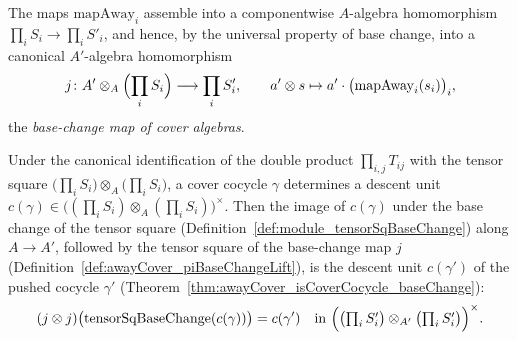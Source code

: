 \begin{definition}
  \label{def:awayCover_piBaseChangeLift}
  \leanok
  The maps \(\mathrm{mapAway}_i\) assemble into a componentwise \(A\)-algebra homomorphism
  \(\prod_i S_i \to \prod_i S'_i\), and hence, by the universal property of base change, into a
  canonical \(A'\)-algebra homomorphism
  \[
    j \colon A' \otimes_A \Bigl(\prod_i S_i\Bigr) \longrightarrow \prod_i S'_i, \qquad
    a' \otimes s \mapsto a' \cdot \bigl(\mathrm{mapAway}_i(s_i)\bigr)_i,
  \]
  the \emph{base-change map of cover algebras}.
\end{definition}

\begin{theorem}
  \label{thm:awayCover_cocycleUnit_baseChange}
  \leanok
  Under the canonical identification of the double product \(\prod_{i,j} T_{ij}\) with the
  tensor square \(\bigl(\prod_i S_i\bigr) \otimes_A \bigl(\prod_i S_i\bigr)\), a cover cocycle
  \(\gamma\) determines a descent unit \(c(\gamma) \in \bigl((\prod_i S_i) \otimes_A (\prod_i
  S_i)\bigr)^{\times}\).  Then the image of \(c(\gamma)\) under the base change of the tensor
  square (Definition~\ref{def:module_tensorSqBaseChange}) along \(A \to A'\), followed by the
  tensor square of the base-change map \(j\)
  (Definition~\ref{def:awayCover_piBaseChangeLift}), is the descent unit \(c(\gamma')\) of the
  pushed cocycle \(\gamma'\) (Theorem~\ref{thm:awayCover_isCoverCocycle_baseChange}):
  \[
    (j \otimes j)\bigl(\mathrm{tensorSqBaseChange}(c(\gamma))\bigr) = c(\gamma')
    \quad\text{in }\Bigl(\bigl(\textstyle\prod_i S'_i\bigr) \otimes_{A'} \bigl(\prod_i
    S'_i\bigr)\Bigr)^{\times}.
  \]
\end{theorem}
